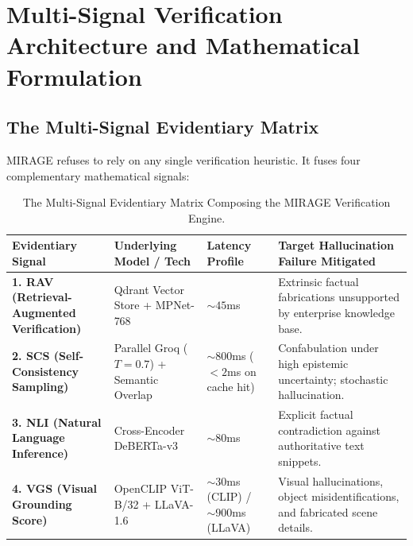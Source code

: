 \documentclass[11pt,a4paper]{article}
\begin{document}
\section{Multi-Signal Verification Architecture and Mathematical Formulation}

\subsection{The Multi-Signal Evidentiary Matrix}
MIRAGE refuses to rely on any single verification heuristic. It fuses four complementary mathematical signals:

\begin{table}[H]
\centering
\small
\renewcommand{\arraystretch}{1.3}
\begin{tabularx}{\linewidth}{p{3.0cm} p{3.2cm} p{2.2cm} X}
\toprule
\textbf{Evidentiary Signal} & \textbf{Underlying Model / Tech} & \textbf{Latency Profile} & \textbf{Target Hallucination Failure Mitigated} \\
\midrule
\textbf{1. RAV (Retrieval-Augmented Verification)} & Qdrant Vector Store + MPNet-768 & $\sim 45$ms & Extrinsic factual fabrications unsupported by enterprise knowledge base. \\
\textbf{2. SCS (Self-Consistency Sampling)} & Parallel Groq ($T=0.7$) + Semantic Overlap & $\sim 800$ms ($<2$ms on cache hit) & Confabulation under high epistemic uncertainty; stochastic hallucination. \\
\textbf{3. NLI (Natural Language Inference)} & Cross-Encoder DeBERTa-v3 & $\sim 80$ms & Explicit factual contradiction against authoritative text snippets. \\
\textbf{4. VGS (Visual Grounding Score)} & OpenCLIP ViT-B/32 + LLaVA-1.6 & $\sim 30$ms (CLIP) / $\sim 900$ms (LLaVA) & Visual hallucinations, object misidentifications, and fabricated scene details. \\
\bottomrule
\end{tabularx}
\caption{The Multi-Signal Evidentiary Matrix Composing the MIRAGE Verification Engine.}
\label{tab:signals_breakdown}
\end{table}
\end{document}
